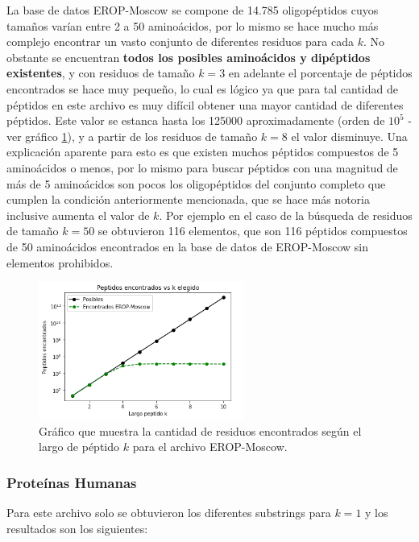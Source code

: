 La base de datos EROP-Moscow se compone de 14.785 oligopéptidos cuyos tamaños varían entre 2 a 50 aminoácidos, por lo mismo se hace mucho más complejo encontrar un vasto conjunto de diferentes residuos para cada $k$. No obstante se encuentran \textbf{todos los posibles aminoácidos y dipéptidos existentes}, y con residuos de tamaño $k=3$ en adelante el porcentaje de péptidos encontrados se hace muy pequeño, lo cual es lógico ya que para tal cantidad de péptidos en este archivo es muy difícil obtener una mayor cantidad de diferentes péptidos. Este valor se estanca hasta los 125000 aproximadamente (orden de $10^{5}$ - ver gráfico \ref{fig:erop}), y a partir de los residuos de tamaño $k=8$ el valor disminuye. Una explicación aparente para esto es que existen muchos péptidos compuestos de 5 aminoácidos o menos, por lo mismo para buscar péptidos con una magnitud de más de 5 aminoácidos son pocos los oligopéptidos del conjunto completo que cumplen la condición anteriormente mencionada, que se hace más notoria inclusive aumenta el valor de $k$. Por ejemplo en el caso de la búsqueda de residuos de tamaño $k=50$ se obtuvieron 116 elementos, que son 116 péptidos compuestos de 50 aminoácidos encontrados en la base de datos de EROP-Moscow sin elementos prohibidos.

\begin{figure}[!htb]
    \centering
    \includegraphics[width=0.6\textwidth]{./images/eropv1.png}
    \caption{Gráfico que muestra la cantidad de residuos encontrados según el largo de péptido $k$ para el archivo EROP-Moscow.}
    \label{fig:erop}
\end{figure}


\subsubsection{Proteínas Humanas}

Para este archivo solo se obtuvieron los diferentes substrings para $k=1$ y los resultados son los siguientes:

